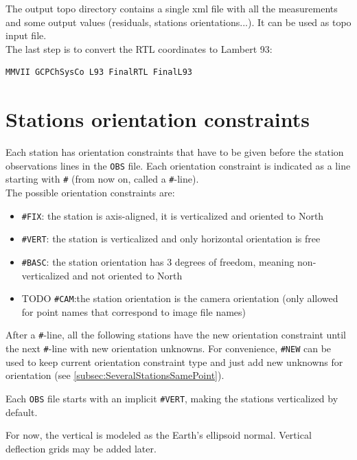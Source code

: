The output topo directory contains a single xml file with all the measurements and some output values (residuals,
stations orientations...). It can be used as topo input file.
\\

The last step is to convert the RTL coordinates to Lambert 93:

\begin{lstlisting}
MMVII GCPChSysCo L93 FinalRTL FinalL93
\end{lstlisting}


\section{Stations orientation constraints}

Each station has orientation constraints that have to be given before the station observations lines in the \texttt{OBS} file.
Each orientation constraint is indicated as a line starting with \texttt{\#} (from now on, called a \texttt{\#}-line).
\\

The possible orientation constraints are:
\begin{itemize}
   \item \texttt{\#FIX}: the station is axis-aligned, it is verticalized and oriented to North
   \item \texttt{\#VERT}: the station is verticalized and only horizontal orientation is free
   \item \texttt{\#BASC}: the station orientation has 3 degrees of freedom, meaning non-verticalized and not oriented to North
   \item TODO \texttt{\#CAM}:the station orientation is the camera orientation (only allowed for point names that correspond to image file names)
\end{itemize}

After a \texttt{\#}-line, all the following stations have the new orientation constraint until the next \texttt{\#}-line with new orientation unknowns.
For convenience, \texttt{\#NEW} can be used to keep current orientation constraint type and just add new unknowns for orientation (see \ref{subsec:SeveralStationsSamePoint}).


Each \texttt{OBS} file starts with an implicit \texttt{\#VERT}, making the stations verticalized by default.

For now, the vertical is modeled as the Earth's ellipsoid normal. Vertical deflection grids may be added later.



